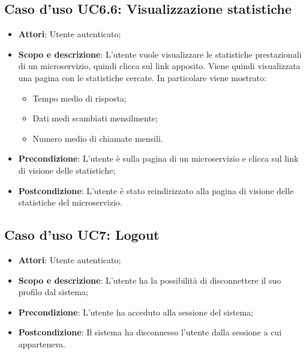 \documentclass[12pt,a4paper,titlepage]{article}
\begin{document}
	\subsection{Caso d'uso UC6.6: Visualizzazione statistiche }
	\label{UC6.6}
	\begin{itemize}
		\item \textbf{Attori}: Utente autenticato;
		\item \textbf{Scopo e descrizione}: L'utente vuole visualizzare le statistiche prestazionali di un microservizio, quindi clicca sul link apposito. Viene quindi visualizzata una pagina con le statistiche cercate. In particolare viene mostrato:
		\begin{itemize}
			\item Tempo medio di risposta;
			\item Dati medi scambiati mensilmente;
			\item Numero medio di chiamate mensili.
		\end{itemize}
		\item \textbf{Precondizione}: L'utente è sulla pagina di un microservizio e clicca sul link di visione delle statistiche;
		\item \textbf{Postcondizione}: L'utente è stato reindirizzato alla pagina di visione delle statistiche del microservizio.
	\end{itemize}
	\subsection{Caso d'uso UC7: Logout}
	\label{UC7}
	\begin{itemize}
		\item \textbf{Attori}: Utente autenticato;
		\item \textbf{Scopo e descrizione}: L'utente ha la possibilità di disconnettere il suo profilo dal sistema;
		\item \textbf{Precondizione}: L'utente ha acceduto alla sessione del sistema;
		\item \textbf{Postcondizione}: Il sistema ha disconnesso l'utente dalla sessione a cui apparteneva.
	\end{itemize}
\end{document}

